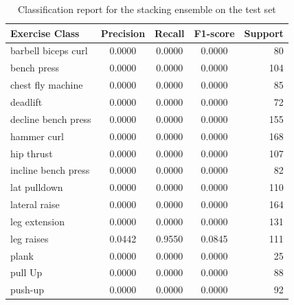 \begin{table}[!h]
\centering
\caption{Classification report for the stacking ensemble on the test set}
\label{tab:stacking-report}
\begin{tabular}{l c c c r}
\hline
\textbf{Exercise Class}   & \textbf{Precision} & \textbf{Recall} & \textbf{F1-score} & \textbf{Support} \\
\hline
barbell biceps curl       & 0.0000             & 0.0000          & 0.0000            & 80               \\
bench press               & 0.0000             & 0.0000          & 0.0000            & 104              \\
chest fly machine         & 0.0000             & 0.0000          & 0.0000            & 85               \\
deadlift                  & 0.0000             & 0.0000          & 0.0000            & 72               \\
decline bench press       & 0.0000             & 0.0000          & 0.0000            & 155              \\
hammer curl               & 0.0000             & 0.0000          & 0.0000            & 168              \\
hip thrust                & 0.0000             & 0.0000          & 0.0000            & 107              \\
incline bench press       & 0.0000             & 0.0000          & 0.0000            & 82               \\
lat pulldown              & 0.0000             & 0.0000          & 0.0000            & 110              \\
lateral raise             & 0.0000             & 0.0000          & 0.0000            & 164              \\
leg extension             & 0.0000             & 0.0000          & 0.0000            & 131              \\
leg raises                & 0.0442             & 0.9550          & 0.0845            & 111              \\
plank                     & 0.0000             & 0.0000          & 0.0000            & 25               \\
pull Up                   & 0.0000             & 0.0000          & 0.0000            & 88               \\
push-up                   & 0.0000             & 0.0000          & 0.0000            & 92               \\

\end{tabular}
\end{table}
